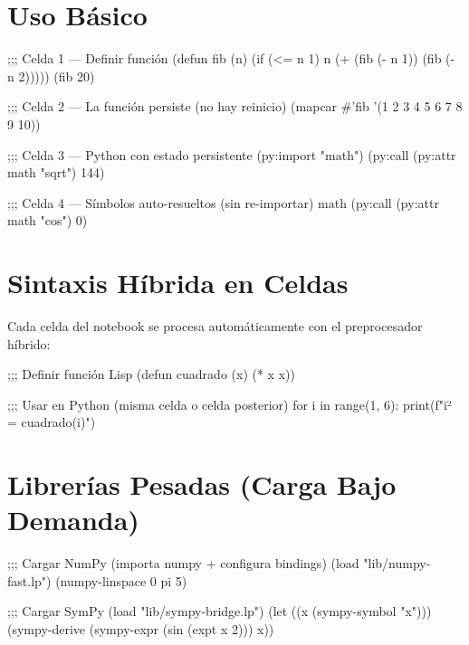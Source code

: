 \section{Uso Básico}

\begin{lispcode}
;;; Celda 1 — Definir función
(defun fib (n)
  (if (<= n 1) n (+ (fib (- n 1)) (fib (- n 2)))))
(fib 20)
\end{lispcode}

\begin{lispcode}
;;; Celda 2 — La función persiste (no hay reinicio)
(mapcar #'fib '(1 2 3 4 5 6 7 8 9 10))
\end{lispcode}

\begin{lispcode}
;;; Celda 3 — Python con estado persistente
(py:import "math")
(py:call (py:attr math "sqrt") 144)
\end{lispcode}

\begin{lispcode}
;;; Celda 4 — Símbolos auto-resueltos (sin re-importar)
math
(py:call (py:attr math "cos") 0)
\end{lispcode}

\section{Sintaxis Híbrida en Celdas}

Cada celda del notebook se procesa automáticamente con el preprocesador híbrido:

\begin{lispcode}
;;; Definir función Lisp
(defun cuadrado (x) (* x x))

;;; Usar en Python (misma celda o celda posterior)
for i in range(1, 6):
    print(f"{i}² = {cuadrado(i)}")
\end{lispcode}

\section{Librerías Pesadas (Carga Bajo Demanda)}

\begin{lispcode}
;;; Cargar NumPy (importa numpy + configura bindings)
(load "lib/numpy-fast.lp")
(numpy-linspace 0 pi 5)

;;; Cargar SymPy
(load "lib/sympy-bridge.lp")
(let ((x (sympy-symbol "x")))
  (sympy-derive (sympy-expr (sin (expt x 2))) x))
\end{lispcode}

